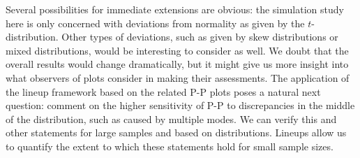 \documentclass{article}\usepackage[]{graphicx}\usepackage[]{color}
\newcommand{\hh}[1]{{\color{magenta} #1}}
\begin{document}
\hh{Several possibilities for immediate extensions are obvious: the simulation study here is only concerned with deviations from normality as given by the $t$-distribution. Other types of deviations, such as given by skew distributions or mixed distributions, would be interesting to consider as well. We doubt that the overall results would change dramatically, but it might give us more insight into what observers of plots consider in making their assessments. }
\hh{The application of the lineup framework based on the related P-P plots poses a natural next question: \citet{koehler91} comment on the higher sensitivity of  P-P  to discrepancies in the middle of the distribution, such as caused by multiple modes. We can verify this and other statements for large samples and based on distributions. Lineups allow us to quantify the extent to which these statements hold for small sample sizes.}




\end{document}
